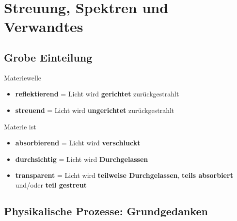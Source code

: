 \section{Streuung, Spektren und Verwandtes}

\subsection{Grobe Einteilung}

Materiewelle
\begin{itemize}
	\item \textbf{reflektierend} = Licht wird \textbf{gerichtet} zurückgestrahlt
	\item \textbf{streuend} = Licht wird \textbf{ungerichtet} zurückgestrahlt
\end{itemize}
Materie ist
\begin{itemize}
	\item \textbf{absorbierend} = Licht wird \textbf{verschluckt}
	\item \textbf{durchsichtig} = Licht wird \textbf{Durchgelassen}
	\item \textbf{transparent} = Licht wird \textbf{teilweise Durchgelassen}, \textbf{teils absorbiert} und/oder \textbf{teil gestreut}
\end{itemize}

\subsection{Physikalische Prozesse: Grundgedanken}

